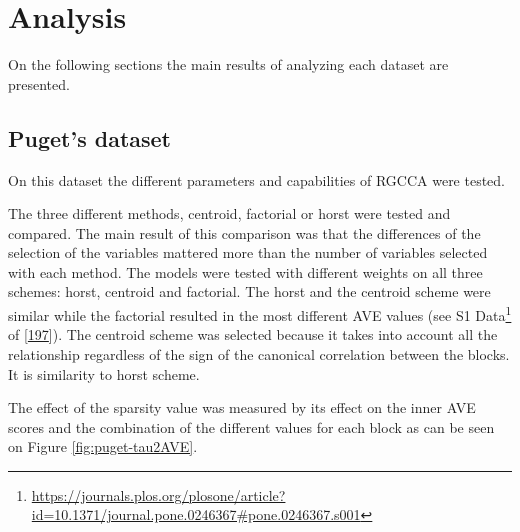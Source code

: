 \documentclass[
  a4paper,
]{book}
\DeclareRobustCommand{\href}[2]{#2\footnote{\url{#1}}}
\begin{document}
\hypertarget{analysis}{%
\section{Analysis}\label{analysis}}

On the following sections the main results of analyzing each dataset are presented.

\hypertarget{results-puget}{%
\subsection{Puget's dataset}\label{results-puget}}

On this dataset the different parameters and capabilities of RGCCA were tested.

The three different methods, centroid, factorial or horst were tested and compared.
The main result of this comparison was that the differences of the selection of the variables mattered more than the number of variables selected with each method.
The models were tested with different weights on all three schemes: horst, centroid and factorial.
The horst and the centroid scheme were similar while the factorial resulted in the most different AVE values (see \href{https://journals.plos.org/plosone/article?id=10.1371/journal.pone.0246367\#pone.0246367.s001}{S1 Data} of {[}\protect\hyperlink{ref-revilla2021}{197}{]}).
The centroid scheme was selected because it takes into account all the relationship regardless of the sign of the canonical correlation between the blocks.
It is similarity to horst scheme.

The effect of the sparsity value was measured by its effect on the inner AVE scores and the combination of the different values for each block as can be seen on Figure \ref{fig:puget-tau2AVE}.
\end{document}
